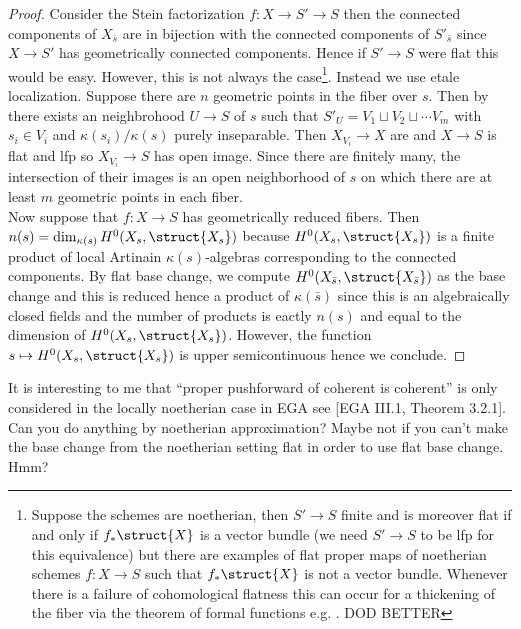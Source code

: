 \documentclass[12pt]{article}
\begin{document}
\begin{proof}
Consider the Stein factorization $f : X \to S' \to S$ then the connected components of $X_{\bar{s}}$ are in bijection with the connected components of $S'_{\bar{s}}$ since $X \to S'$ has geometrically connected components. Hence if $S' \to S$ were flat this would be easy. However, this is not always the case\footnote{Suppose the schemes are noetherian, then $S' \to S$ finite and is moreover flat if and only if $f_* \struct{X}$ is a vector bundle (we need $S' \to S$ to be lfp for this equivalence) but there are examples of flat proper maps of noetherian schemes $f : X \to S$ such that $f_* \struct{X}$ is not a vector bundle. Whenever there is a failure of cohomological flatness this can occur for a thickening of the fiber via the theorem of formal functions e.g. . DOD BETTER  }. Instead we use etale localization. Suppose there are $n$ geometric points in the fiber over $s$. Then by  there exists an \etale neighbrohood $U \to S$ of $s$ such that $S'_U = V_1 \sqcup V_2 \sqcup \cdots V_m$ with $s_i \in V_i$ and $\kappa(s_i) / \kappa(s)$ purely inseparable. Then $X_{V_i} \to X$ are \etale and $X \to S$ is flat and lfp so $X_{V_i} \to S$ has open image. Since there are finitely many, the intersection of their images is an open neighborhood of $s$ on which there are at least $m$ geometric points in each fiber.
\bigskip\\
Now suppose that $f : X \to S$ has geometrically reduced fibers. Then $n(s) = \dim_{\kappa(s)} H^0(X_s, \struct{X_s})$ because $H^0(X_s, \struct{X_s})$ is a finite product of local Artinain $\kappa(s)$-algebras corresponding to the connected components. By flat base change, we compute $H^0(X_{\bar{s}}, \struct{X_{\bar{s}}})$ as the base change and this is reduced hence a product of $\kappa(\bar{s})$ since this is an algebraically closed fields and the number of products is eactly $n(s)$ and equal to the dimension of $H^0(X_s, \struct{X_s})$. However, the function $s \mapsto H^0(X_{s}, \struct{X_s})$ is upper semicontinuous hence we conclude.
\end{proof}

\begin{rmk}
It is interesting to me that ``proper pushforward of coherent is coherent'' is only considered in the locally noetherian case in EGA see [EGA III.1, Theorem 3.2.1]. Can you do anything by noetherian approximation? Maybe not if you can't make the base change from the noetherian setting flat in order to use flat base change. Hmm?
\end{rmk}
\end{document}
